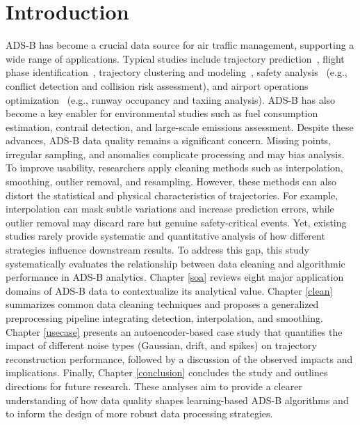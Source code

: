 \section{Introduction}

ADS-B has become a crucial data source for air traffic management, supporting a wide range of applications. Typical studies include trajectory prediction~\cite{wang2021performance,corrado2021clustering}, flight phase identification~\cite{schlosser2024analysis}, trajectory clustering and modeling~\cite{guleriamachine}, safety analysis~\cite{noh2018aviation} (e.g., conflict detection and collision risk assessment), and airport operations optimization~\cite{roosenbrand2023contrail} (e.g., runway occupancy and taxiing analysis). ADS-B has also become a key enabler for environmental studies such as fuel consumption estimation, contrail detection, and large-scale emissions assessment.
Despite these advances, ADS-B data quality remains a significant concern. Missing points, irregular sampling, and anomalies complicate processing and may bias analysis. To improve usability, researchers apply cleaning methods such as interpolation, smoothing, outlier removal, and resampling. However, these methods can also distort the statistical and physical characteristics of trajectories. For example, interpolation can mask subtle variations and increase prediction errors, while outlier removal may discard rare but genuine safety-critical events. Yet, existing studies rarely provide systematic and quantitative analysis of how different strategies influence downstream results.
To address this gap, this study systematically evaluates the relationship between data cleaning and algorithmic performance in ADS-B analytics. Chapter \ref{soa} reviews eight major application domains of ADS-B data to contextualize its analytical value. Chapter \ref{clean}  summarizes common data cleaning techniques and proposes a generalized preprocessing pipeline integrating detection, interpolation, and smoothing. Chapter \ref{usecase} presents an autoencoder-based case study that quantifies the impact of different noise types (Gaussian, drift, and spikes) on trajectory reconstruction performance, followed by a discussion of the observed impacts and implications. Finally, Chapter \ref{conclusion} concludes the study and outlines directions for future research. These analyses aim to provide a clearer understanding of how data quality shapes learning-based ADS-B algorithms and to inform the design of more robust data processing strategies.